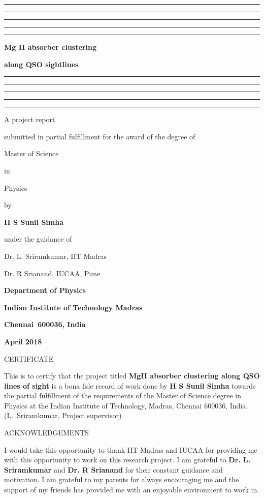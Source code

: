 \documentclass[12pt,a4paper,oneside]{book}
\begin{document}

\baselineskip 20pt




\thispagestyle{empty}
\topskip 15pt
\hrule\hrule\hrule\hrule\hrule
\vskip 20pt
\centerline{\Huge \bf Mg II absorber clustering} 
\vskip 15pt
\centerline{\Huge \bf along QSO sightlines} 
\vskip 20pt
\hrule\hrule\hrule\hrule\hrule
\vskip 30pt
\centerline{\Large A project report}
\vskip 8pt
\centerline{\Large submitted in partial fulfillment 
for the award of the degree of}
\vskip 8pt
\centerline{\Large Master of Science}
\vskip 8pt
\centerline{\Large in}
\vskip 8pt 
\centerline{\Large Physics}
\vskip 8pt
\centerline{\Large by}
\vskip 8pt
\centerline{\Large \bf H S Sunil Simha}
\vskip 8pt
\centerline{\Large under the guidance of}
\vskip 8pt
\centerline{\Large  Dr. L. Sriramkumar, IIT Madras}

\vskip 8pt
\centerline{\Large  Dr. R Srianand, IUCAA, Pune}
\vskip 30pt 
\begin{center}
\end{center}
\vskip 8pt 
\centerline{\Large \bf Department of Physics}
\vskip 8pt 
\centerline{\Large \bf Indian Institute of Technology Madras}
\vskip 8pt 
\centerline{\Large \bf Chennai~600036, India}
\vskip 8pt
\centerline{\Large \bf April 2018}

\newpage\topskip 40pt
\centerline{\Large CERTIFICATE}
\thispagestyle{empty}
\vskip 20pt\noindent 
This is to certify that the project titled {\bf MgII absorber clustering along QSO lines of sight} is a bona fide record of work done by 
{\bf H S Sunil Simha} towards the partial fulfillment of the 
requirements of the Master of Science degree in Physics at the Indian 
Institute of Technology, Madras, Chennai 600036, India.
\vskip 120pt
\hspace{240pt}(L.~Sriramkumar, Project supervisor)


\newpage\topskip 40pt
\thispagestyle{empty}
\centerline{\Large ACKNOWLEDGEMENTS}
\vskip 20pt\noindent 
I would take this opportunity to thank IIT Madras and IUCAA for providing me with this opportunity to work on this research project. I am grateful to {\bf Dr. L. Sriramkumar} and {\bf Dr. R Srianand} for their constant
guidance and motivation. 
I am grateful to my parents for always encouraging me and the support of my
friends has provided me with an enjoyable environment to work in.
\end{document}
